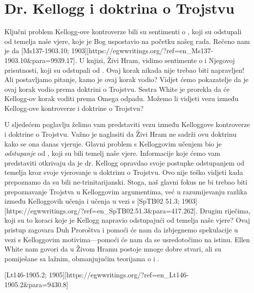 \chapter{Dr. Kellogg i doktrina o Trojstvu}

Ključni problem Kellogg-ove kontroverze bili su sentimenti o , koji su odstupali od temelja naše vjere, koje je Bog uspostavio na početku našeg rada. Rečeno nam je da [Ms137-1903.10; 1903][https://egwwritings.org/?ref=en\_Ms137-1903.10&para=9939.17]. U knjizi, Živi Hram, vidimo sentimente o  i Njegovoj prisutnosti, koji su odstupali od . Ovaj korak nikada nije trebao biti napravljen! Ali postavljamo pitanje, kamo je ovaj korak vodio? Vidjet ćemo pokazatelje da je ovaj korak vodio prema doktrini o Trojstvu. Sestra White je prorekla da će Kellogg-ov korak voditi prema Omega odpadu. Možemo li vidjeti vezu između Kellogg-ove kontroverze i doktrine o Trojstvu?

U sljedećem poglavlju želimo vam predstaviti vezu između Kelloggove kontroverze i doktrine o Trojstvu. Važno je naglasiti da Živi Hram ne sadrži ovu doktrinu kako se ona danas vjeruje. Glavni problem s Kelloggovim učenjem bio je \textit{odstupanje} od , koji su bili temelj naše vjere. Informacije koje ćemo vam predstaviti otkrivaju da je dr. Kellogg opravdao svoje postupke odstupanjem od temelja kroz svoje vjerovanje u doktrinu o Trojstvu. Ovo nije teško vidjeti kada prepoznamo da su  bili ne-trinitarijanski. Stoga, naš glavni fokus ne bi trebao biti prepoznavanje Trojstva u Kelloggovim argumentima, već u razumijevanju razlika između Kelloggovih učenja i učenja  u vezi s [SpTB02 51.3; 1903][https://egwwritings.org/?ref=en\_SpTB02.51.3&para=417.262]. Drugim riječima, koji su to koraci koje je Kellogg napravio odstupajući od temelja naše vjere? Ovaj pristup zagovara Duh Proroštva i pomoći će nam da izbjegnemo spekulacije u vezi s Kelloggovim motivima—pomoći će nam da se usredotočimo na istinu. Ellen White nam govori da u Živom Hramu postoje mnoge dobre stvari, ali su pomiješane sa lažnim, obmanjujućim teorijama o  i .

[Lt146-1905.2; 1905][https://egwwritings.org/?ref=en\_Lt146-1905.2&para=9430.8]


